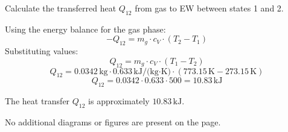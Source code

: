 Calculate the transferred heat \( Q_{12} \) from gas to EW between states 1 and 2.  

Using the energy balance for the gas phase:  
\[
-Q_{12} = m_g \cdot c_V \cdot (T_2 - T_1)
\]  
Substituting values:  
\[
Q_{12} = m_g \cdot c_V \cdot (T_1 - T_2)
\]  
\[
Q_{12} = 0.0342 \, \text{kg} \cdot 0.633 \, \text{kJ/(kg·K)} \cdot (773.15 \, \text{K} - 273.15 \, \text{K})
\]  
\[
Q_{12} = 0.0342 \cdot 0.633 \cdot 500 = 10.83 \, \text{kJ}
\]  

The heat transfer \( Q_{12} \) is approximately \( 10.83 \, \text{kJ} \).  

No additional diagrams or figures are present on the page.